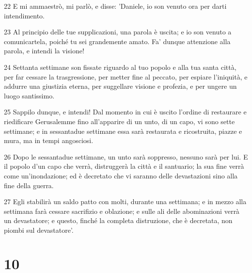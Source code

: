 \par 22 E mi ammaestrò, mi parlò, e disse: 'Daniele, io son venuto ora per darti intendimento.
\par 23 Al principio delle tue supplicazioni, una parola è uscita; e io son venuto a comunicartela, poiché tu sei grandemente amato. Fa' dunque attenzione alla parola, e intendi la visione!
\par 24 Settanta settimane son fissate riguardo al tuo popolo e alla tua santa città, per far cessare la trasgressione, per metter fine al peccato, per espiare l'iniquità, e addurre una giustizia eterna, per suggellare visione e profezia, e per ungere un luogo santissimo.
\par 25 Sappilo dunque, e intendi! Dal momento in cui è uscito l'ordine di restaurare e riedificare Gerusalemme fino all'apparire di un unto, di un capo, vi sono sette settimane; e in sessantadue settimane essa sarà restaurata e ricostruita, piazze e mura, ma in tempi angosciosi.
\par 26 Dopo le sessantadue settimane, un unto sarà soppresso, nessuno sarà per lui. E il popolo d'un capo che verrà, distruggerà la città e il santuario; la sua fine verrà come un'inondazione; ed è decretato che vi saranno delle devastazioni sino alla fine della guerra.
\par 27 Egli stabilirà un saldo patto con molti, durante una settimana; e in mezzo alla settimana farà cessare sacrifizio e oblazione; e sulle ali delle abominazioni verrà un devastatore; e questo, finché la completa distruzione, che è decretata, non piombi sul devastatore'.

\chapter{10}

